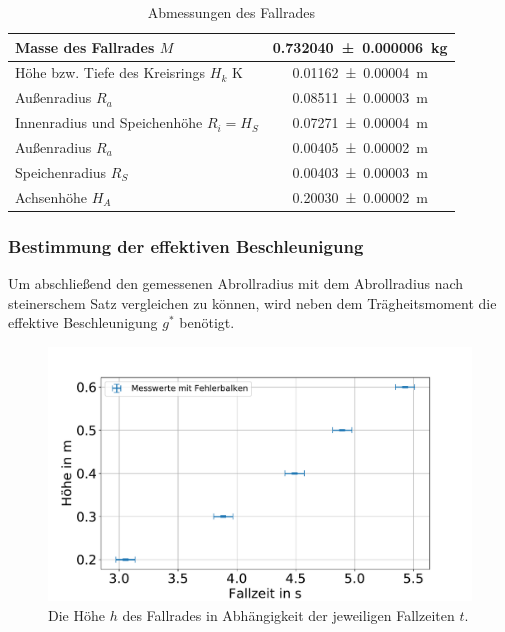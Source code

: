 \begin{table}
	\centering
	\caption{Abmessungen des Fallrades}
	\begin{tabular}{|l|c|}
	\hline 
	Masse des Fallrades $M$& \SI{0.732040\pm 0.000006}{kg} \\ 
	\hline 
	Höhe bzw. Tiefe des Kreisrings $H_k$ K& \SI{0.01162\pm 0.00004}{m} \\ 
	\hline 
	Außenradius $R_a$ & \SI{0.08511\pm 0.00003}{m} \\ 
	\hline 
	Innenradius und Speichenhöhe $R_i=H_S$ & \SI{0.07271\pm 0.00004}{m}  \\ 
	\hline 
	Außenradius $R_a$	& \SI{0.00405 \pm 0.00002}{m} \\ 
	\hline 
	Speichenradius $R_S$& \SI{0.00403 \pm 0.00003}{m} \\ 
	\hline 
	Achsenhöhe $H_A$& \SI{0.20030\pm 0.00002}{m} \\ 
	\hline 

\end{tabular}
\label{tab:datafall} 
\end{table}








\subsubsection{Bestimmung der effektiven Beschleunigung }
Um abschließend den gemessenen Abrollradius mit dem Abrollradius nach steinerschem Satz vergleichen zu können, wird neben dem Trägheitsmoment die effektive Beschleunigung $g^*$ benötigt.





\begin{figure}[h!]
	\centering
	\includegraphics[width=0.7\linewidth]{auswertung/Fallrad/h,t}
	\caption{Die Höhe $h$ des Fallrades in Abhängigkeit der jeweiligen Fallzeiten $t$.}
	\label{fig:ht}
\end{figure}



